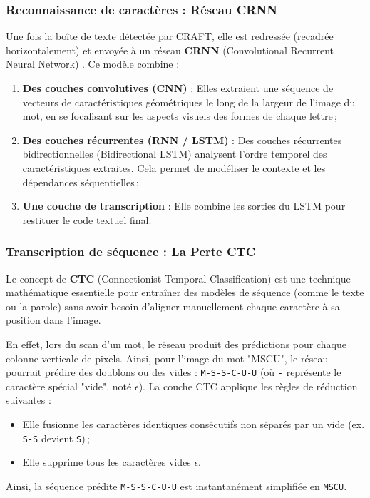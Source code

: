 \documentclass[12pt,a4paper]{article}
\begin{document}
\subsubsection{Reconnaissance de caractères : Réseau CRNN}
Une fois la boîte de texte détectée par CRAFT, elle est redressée (recadrée horizontalement) et envoyée à un réseau \textbf{CRNN} (Convolutional Recurrent Neural Network) \cite{Shi2016CRNN}. Ce modèle combine :
\begin{enumerate}
  \item \textbf{Des couches convolutives (CNN)} : Elles extraient une séquence de vecteurs de caractéristiques géométriques le long de la largeur de l'image du mot, en se focalisant sur les aspects visuels des formes de chaque lettre\,;
  \item \textbf{Des couches récurrentes (RNN / LSTM)} : Des couches récurrentes bidirectionnelles (Bidirectional LSTM) analysent l'ordre temporel des caractéristiques extraites. Cela permet de modéliser le contexte et les dépendances séquentielles\,;
  \item \textbf{Une couche de transcription} : Elle combine les sorties du LSTM pour restituer le code textuel final.
\end{enumerate}

\subsubsection{Transcription de séquence : La Perte CTC}
Le concept de \textbf{CTC} (Connectionist Temporal Classification) \cite{Graves2006CTC} est une technique mathématique essentielle pour entraîner des modèles de séquence (comme le texte ou la parole) sans avoir besoin d'aligner manuellement chaque caractère à sa position dans l'image.

En effet, lors du scan d'un mot, le réseau produit des prédictions pour chaque colonne verticale de pixels. Ainsi, pour l'image du mot "MSCU", le réseau pourrait prédire des doublons ou des vides : \texttt{M-S-S-C-U-U} (où \texttt{-} représente le caractère spécial "vide", noté $\epsilon$).
La couche CTC applique les règles de réduction suivantes :
\begin{itemize}
  \item Elle fusionne les caractères identiques consécutifs non séparés par un vide (ex. \texttt{S-S} devient \texttt{S})\,;
  \item Elle supprime tous les caractères vides $\epsilon$.
\end{itemize}
Ainsi, la séquence prédite \texttt{M-S-S-C-U-U} est instantanément simplifiée en \texttt{MSCU}.
\end{document}
